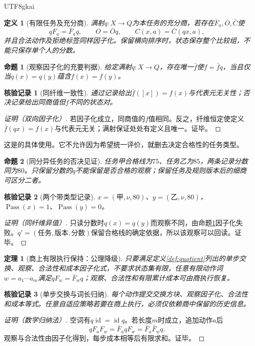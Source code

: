 \documentclass[12pt,a4paper,openany]{report}
\newtheorem{definition}{定义}[chapter]
\newtheorem{theorem}{定理}[chapter]
\newtheorem{proposition}{命题}[chapter]
\newtheorem{Certificate}{核验记录}[chapter]
\begin{document}
\begin{CJK*}{UTF8}{gkai}
\begin{definition}[有限任务及充分商]
满射$q:X\to Q$为本任务的充分商，若存在$\bar F_a,\bar O,\bar C$使
\[
 qF_a=\bar F_aq,\qquad O=\bar Oq,\qquad C(x,a)=\bar C(qx,a),
\]
并且合法动作及拒绝标签同样因子化。保留横向排序时，状态保存整个比较组，不能只保存单个人的分数。
\end{definition}
\begin{proposition}[观察因子化的充要判据]
\label{prop:factor}
给定满射$q:X\to Q$，存在唯一$\bar f$使$f=\bar f q$，当且仅当$q(x)=q(y)$蕴含$f(x)=f(y)$。
\end{proposition}
\begin{Certificate}[同纤维一致性]
通过记录给出$\bar f([x])=f(x)$与代表元无关性；否决记录给出同商值但$f$不同的状态对。
\end{Certificate}
\begin{proof}[证明（双向因子化）]
若因子化成立，同商值的$f$值相同。反之，纤维恒定使定义$\bar f(qx)=f(x)$与代表元无关；满射保证处处有定义且唯一。证毕。
\end{proof}
这是\cite[“相对任务的不变量与信息保持”及任务因子化接口]{SourceRateQuotient}的具体使用。它不允许因为希望统一评价，就删去决定合格性的任务类型。

\begin{proposition}[同分异任务的否决见证]
\label{prop:typed-score}
任务甲合格线为$75$、任务乙为$85$，两条记录分数同为$80$。只保留分数的$q$不能保留是否合格的观察；保留任务及规则版本后的细商可区分二者。
\end{proposition}
\begin{Certificate}[两个带类型记录]
$x=(\mathrm{甲},\nu,80)$、$y=(\mathrm{乙},\nu,80)$，$\operatorname{Pass}(x)=1$、$\operatorname{Pass}(y)=0$。
\end{Certificate}
\begin{proof}[证明（同纤维异值）]
只读分数时$q(x)=q(y)$而观察不同，由命题\ref{prop:factor}因子化失败。$q'=(\text{任务},\text{版本},\text{分数})$保留合格线的确定依据，所以该观察可以回读。证毕。
\end{proof}

\begin{theorem}[商上有限执行保持：公理降级]
\label{thm:execution}
只要满足定义\ref{def:quotient}列出的单步交换、观察、合法性和成本因子化式，不要求状态集有限，任意有限动作词$w=a_1\cdots a_m$满足$qF_w=\bar F_wq$；观察、合法性和有限累计成本可由商执行恢复。
\end{theorem}
\begin{Certificate}[单步交换与词长归纳]
每个动作提交交换方块、观察因子化、合法性和成本等式。任意自适应策略若要在商上执行，必须仅依赖商中保留的历史信息。
\end{Certificate}
\begin{proof}[证明（数学归纳法）]
空词有$q\operatorname{id}=\operatorname{id}q$。若长度$m$时成立，追加动作$a$后
\[
 qF_aF_w=\bar F_aqF_w=\bar F_a\bar F_wq.
\]
观察与合法性由因子化得到，每步成本相等后有限求和。证毕。
\end{proof}


\end{CJK*}
\end{document}
